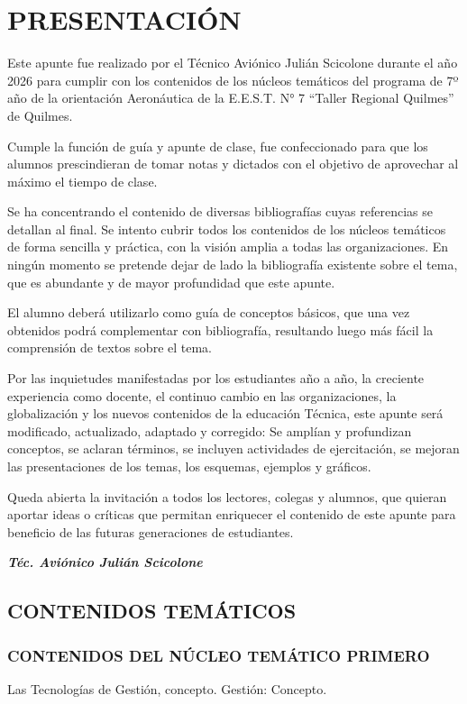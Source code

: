 
\section*{PRESENTACIÓN}
Este apunte fue realizado por el Técnico Aviónico Julián Scicolone durante el año 2026 para cumplir con los contenidos de los núcleos temáticos del programa de 7º año de la orientación Aeronáutica de la E.E.S.T. N° 7 “Taller Regional Quilmes” de Quilmes.

Cumple la función de guía y apunte de clase, fue confeccionado para que los alumnos prescindieran de tomar notas y dictados con el objetivo de aprovechar al máximo el tiempo de clase.

Se ha concentrando el contenido de diversas bibliografías cuyas referencias se detallan al final. Se intento cubrir todos los contenidos de los núcleos temáticos de forma sencilla y práctica, con la visión amplia a todas las organizaciones. En ningún momento se pretende dejar de lado la bibliografía existente sobre el tema, que es abundante y de mayor profundidad que este apunte.

El alumno deberá utilizarlo como guía de conceptos básicos, que una vez obtenidos podrá complementar con bibliografía, resultando luego más fácil la comprensión de textos sobre el tema.

Por las inquietudes manifestadas por los estudiantes año a año, la creciente experiencia como docente, el continuo cambio en las organizaciones, la globalización y los nuevos contenidos de la educación Técnica, este apunte será modificado, actualizado, adaptado y corregido: Se amplían y profundizan conceptos, se aclaran términos, se incluyen actividades de ejercitación, se mejoran las presentaciones de los temas, los esquemas, ejemplos y gráficos.

Queda abierta la invitación a todos los lectores, colegas y alumnos, que quieran aportar ideas o críticas que permitan enriquecer el contenido de este apunte para beneficio de las futuras generaciones de estudiantes.

{\raggedleft \textbf{\textit{Téc. Aviónico Julián Scicolone}}\par}



\subsection*{CONTENIDOS TEMÁTICOS}
\subsubsection*{CONTENIDOS DEL NÚCLEO TEMÁTICO PRIMERO}
Las Tecnologías de Gestión, concepto. Gestión: Concepto.

